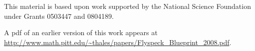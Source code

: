 \noindent

\bigskip\noindent
This material is based upon work supported by the National Science
Foundation under
Grants 0503447 and 0804189.

\bigskip\noindent\svninfo 

\bigskip\noindent
A pdf of an earlier version of this work appears at\hfill\break 
\url{http://www.math.pitt.edu/~thales/papers/Flyspeck_Blueprint_2008.pdf}.

\bigskip\noindent


\smallskip
\newpage


